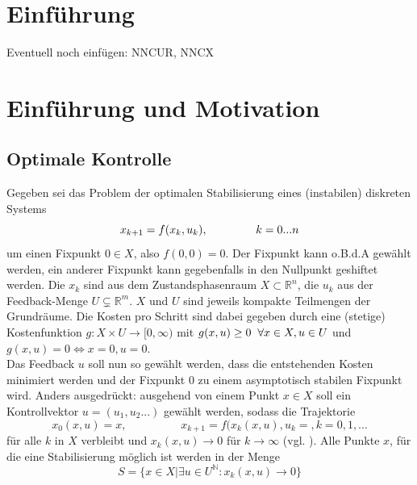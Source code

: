 \documentclass[12pt,a4paper,twoside]{article}
\begin{document}
\newpage
\tableofcontents
\newpage

\pagestyle{headings}

\section{Einführung}
Eventuell noch einfügen: NNCUR, NNCX

\section{Einführung und Motivation}
	\subsection{Optimale Kontrolle}
	Gegeben sei das Problem der optimalen Stabilisierung eines (instabilen) diskreten Systems
	\begin{equation}
		x_{k+1}=f(x_k,u_k), \hspace{1,5cm} k=0...n
	\end{equation}
	um einen Fixpunkt $0\in X$, also $f(0,0)=0$. Der Fixpunkt kann o.B.d.A gewählt werden, ein anderer Fixpunkt kann 
	gegebenfalls in den Nullpunkt geshiftet werden. Die $x_k$ sind aus dem Zustandsphasenraum $X\subset \mathbb{R}^n
	$, die $u_k$ aus der Feedback-Menge $U\subsetneq \mathds{R}^m$. $X$ und $U$ sind jeweils kompakte Teilmengen der 
	Grundräume. Die Kosten pro Schritt sind dabei gegeben durch eine (stetige) Kostenfunktion $g: X\times U
	\rightarrow [0,\infty)$ mit $g(x,u)\geq 0 \hspace{0,2cm}\forall x\in X, u\in U$ und $g(x,u)=0 \Leftrightarrow 
	x=0, u=0$. \\
	Das Feedback $u$ soll nun so gewählt werden, dass die entstehenden Kosten minimiert werden und der Fixpunkt $0$ 
	zu einem asymptotisch stabilen Fixpunkt wird. Anders ausgedrückt: ausgehend von einem Punkt $x\in X$ soll ein
	Kontrollvektor $u=(u_1,u_2...)$ gewählt werden, sodass die Trajektorie 
	\begin{equation*}
		x_0(x,u)=x, \hspace{2cm} x_{k+1}=f(x_k(x,u),u_k=, k=0,1,...
	\end{equation*}
	für alle $k$ in $X$ verbleibt und $x_k(x,u)\rightarrow 0$ für $k\rightarrow\infty$ (vgl. \cite{Grune2005}). Alle Punkte $x$, für die eine Stabilisierung möglich ist werden in der Menge 
	\begin{equation*}
		S=\{x\in X| \exists u\in U^{\mathds{N}}: x_k(x,u)\rightarrow 0\}
	\end{equation*}
\end{document}
